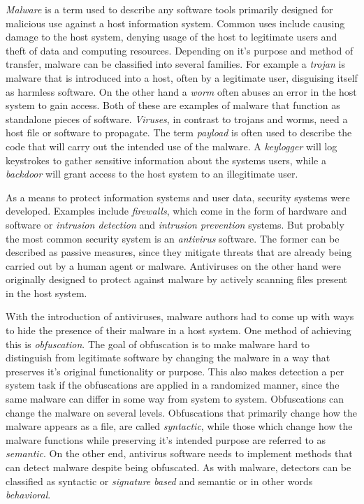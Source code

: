 \emph{Malware} is a term used to describe any software tools primarily designed for malicious use against a host information system. Common uses include causing damage to the host system, denying usage of the host to legitimate users and theft of data and computing resources. Depending on it's purpose and method of transfer, malware can be classified into several families. For example a \emph{trojan} is malware that is introduced into a host, often by a legitimate user, disguising itself as harmless software. On the other hand a \emph{worm} often abuses an error in the host system to gain access. Both of these are examples of malware that function as standalone pieces of software. \emph{Viruses}, in contrast to trojans and worms, need a host file or software to propagate. The term \emph{payload} is often used to describe the code that will carry out the intended use of the malware. A \emph{keylogger} will log keystrokes to gather sensitive information about the systems users, while a \emph{backdoor} will grant access to the host system to an illegitimate user.


As a means to protect information systems and user data, security systems were developed. Examples include \emph{firewalls}, which come in the form of hardware and software or \emph{intrusion detection} and \emph{intrusion prevention} systems. But probably the most common security system is an \emph{antivirus} software. The former can be described as passive measures, since they mitigate threats that are already being carried out by a human agent or malware. Antiviruses on the other hand were originally designed to protect against malware by actively scanning files present in the host system.

With the introduction of antiviruses, malware authors had to come up with ways to hide the presence of their malware in a host system. One method of achieving this is \emph{obfuscation}. The goal of obfuscation is to make malware hard to distinguish from legitimate software by changing the malware in a way that preserves it's original functionality or purpose. This also makes detection a per system task if the obfuscations are applied in a randomized manner, since the same malware can differ in some way from system to system. Obfuscations can change the malware on several levels. Obfuscations that primarily change how the malware appears as a file, are called \emph{syntactic}, while those which change how the malware functions while preserving it's intended purpose are referred to as \emph{semantic}. On the other end, antivirus software needs to implement methods that can detect malware despite being obfuscated. As with malware, detectors can be classified as syntactic or \emph{signature based} and semantic or in other words \emph{behavioral}.


